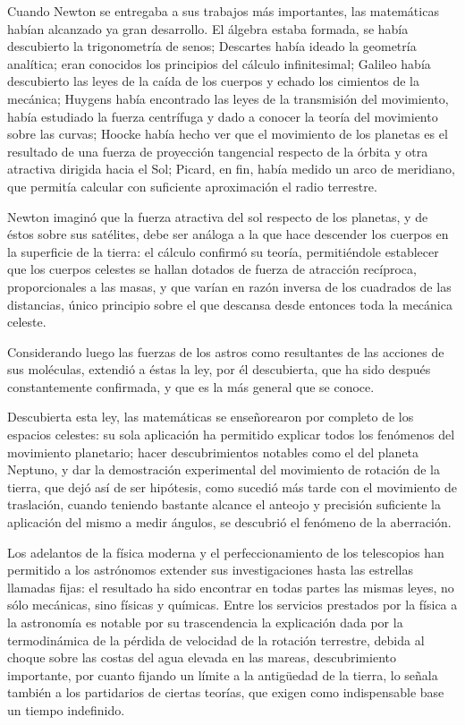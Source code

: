 \documentclass[a4paper, 12pt]{article}
\begin{document}
Cuando Newton se entregaba a sus trabajos más importantes, las matemáticas habían alcanzado ya gran desarrollo. El álgebra estaba formada, se había descubierto la trigonometría de senos; Descartes había ideado la geometría analítica; eran conocidos los principios del cálculo infinitesimal; Galileo había descubierto las leyes de la caída de los cuerpos y echado los cimientos de la mecánica; Huygens había encontrado las leyes de la transmisión del movimiento, había estudiado la fuerza centrífuga y dado a conocer la teoría del movimiento sobre las curvas; Hoocke había hecho ver que el movimiento de los planetas es el resultado de una fuerza de proyección tangencial respecto de la órbita y otra atractiva dirigida hacia el Sol; Picard, en fin, había medido un arco de meridiano, que permitía calcular con suficiente aproximación el radio terrestre.




Newton imaginó que la fuerza atractiva del sol respecto de los planetas, y de éstos sobre sus satélites, debe ser análoga a la que hace descender los cuerpos en la superficie de la tierra: el cálculo confirmó su teoría, permitiéndole establecer que los cuerpos celestes se hallan dotados de fuerza de atracción recíproca, proporcionales a las masas, y que varían en razón inversa de los cuadrados de las distancias, único principio sobre el que descansa desde entonces toda la mecánica celeste.


Considerando luego las fuerzas de los astros como resultantes de las acciones de sus moléculas, extendió a éstas la ley, por él descubierta, que ha sido después constantemente confirmada, y que es la más general que se conoce.

Descubierta esta ley, las matemáticas se enseñorearon por completo de los espacios celestes: su sola aplicación ha permitido explicar todos los fenómenos del movimiento planetario; hacer descubrimientos notables como el del planeta Neptuno, y dar la demostración experimental del movimiento de rotación de la tierra, que dejó así de ser hipótesis, como sucedió más tarde con el movimiento de traslación, cuando teniendo bastante alcance el anteojo y precisión suficiente la aplicación del mismo a medir ángulos, se descubrió el fenómeno de la aberración.

Los adelantos de la física moderna y el perfeccionamiento de los telescopios han permitido a los astrónomos extender sus investigaciones hasta las estrellas llamadas fijas: el resultado ha sido encontrar en todas partes las mismas leyes, no sólo mecánicas, sino físicas y químicas. Entre los servicios prestados por la física a la astronomía es notable por su trascendencia la explicación dada por la termodinámica de la pérdida de velocidad de la rotación terrestre, debida al choque sobre las costas del agua elevada en las mareas, descubrimiento importante, por cuanto fijando un límite a la antigüedad de la tierra, lo señala también a los partidarios de ciertas teorías, que exigen como indispensable base un tiempo indefinido.
\end{document}
